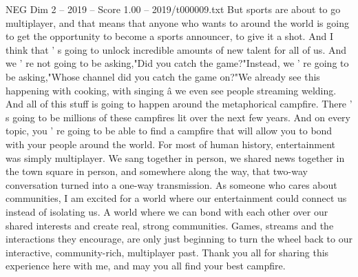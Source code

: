 \begin{textsample}{NEG Dim 2 – 2019 – Score 1.00 – 2019/t000009.txt}
But sports are about to go multiplayer, and that means that anyone who wants to around the world is going to get the opportunity to become a sports announcer, to give it a shot.
And I think that ' s going to unlock incredible amounts of new talent for all of us.
And we ' re not going to be asking,"Did you catch the game?"Instead, we ' re going to be asking,"Whose channel did you catch the game on?"We already see this happening with cooking, with singing â we even see people streaming welding.
And all of this stuff is going to happen around the metaphorical campfire.
There ' s going to be millions of these campfires lit over the next few years.
And on every topic, you ' re going to be able to find a campfire that will allow you to bond with your people around the world.
For most of human history, entertainment was simply multiplayer.
We sang together in person, we shared news together in the town square in person, and somewhere along the way, that two-way conversation turned into a one-way transmission.
As someone who cares about communities, I am excited for a world where our entertainment could connect us instead of isolating us.
A world where we can bond with each other over our shared interests and create real, strong communities.
Games, streams and the interactions they encourage, are only just beginning to turn the wheel back to our interactive, community-rich, multiplayer past.
Thank you all for sharing this experience here with me, and may you all find your best campfire.

\end{textsample}
